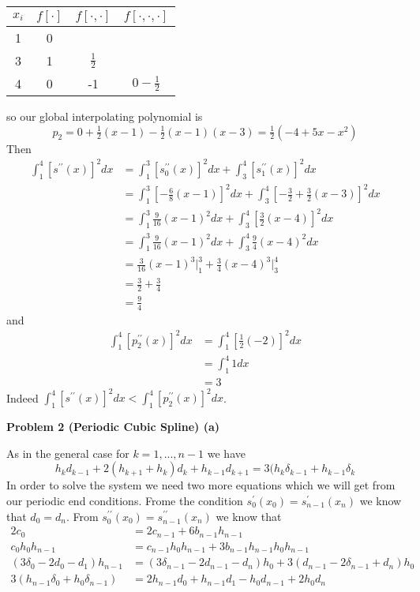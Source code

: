 \documentclass[12pt]{article}
\newcommand{\problem}[1]{\hspace{-4 ex} \large \textbf{Problem #1} }
\begin{document}
	\begin{center}
		\begin{tabular}{|c|c|c|c|}\hline
			$x_i$ & $f[\cdot]$ & $f[\cdot,\cdot]$ & $f[\cdot,\cdot,\cdot]$ \\ \hline
			1 & 0 & & \\ \hline
			3 & 1 & $\tfrac{1}{2}$ &\\ \hline
			4 & 0 & -1 & $0-\tfrac{1}{2}$ \\ \hline
		\end{tabular}
	\end{center}
	so our global interpolating polynomial is 
	$$
	p_2 = 0 + \tfrac{1}{2}(x-1) - \tfrac{1}{2}(x-1)(x-3) = \tfrac{1}{2}(-4+5x-x^2)
	$$
	Then
	\begin{align*}
		\int_1^4 [s^{\prime\prime}(x)]^2 dx & = \int_1^3 [s_0^{\prime\prime}(x)]^2 dx + \int_3^4 [s_1^{\prime\prime}(x)]^2 dx \\
		& = \int_1^3 [-\tfrac{6}{8}(x-1)]^2 dx + \int_3^4 [-\tfrac{3}{2} + \tfrac{3}{2}(x-3)]^2 dx \\
		& = \int_1^3 \tfrac{9}{16}(x-1)^2 dx + \int_3^4 [\tfrac{3}{2}(x-4)]^2 dx \\
		& = \int_1^3 \tfrac{9}{16}(x-1)^2 dx + \int_3^4 \tfrac{9}{4}(x-4)^2 dx \\
		& = \tfrac{3}{16}(x-1)^3 \Big\vert_1^3 + \tfrac{3}{4}(x-4)^3 \Big\vert_3^4 \\
		& = \tfrac{3}{2} + \tfrac{3}{4} \\
		& = \tfrac{9}{4}
	\end{align*}
	and 
	\begin{align*}
		\int_1^4 [p_2^{\prime\prime}(x)]^2 dx & = \int_1^4 [\tfrac{1}{2}(-2)]^2 dx \\
		& = \int_1^4 1 dx \\
		& = 3
	\end{align*}
	Indeed $\int_1^4 [s^{\prime\prime}(x)]^2 dx < \int_1^4 [p_2^{\prime\prime}(x)]^2 dx$.
	
\problem{2 (Periodic Cubic Spline) (a)}
	
	As in the general case for $k = 1, ..., n-1$ we have
	$$
	h_kd_{k-1} + 2(h_{k+1} + h_{k})d_k + h_{k-1}d_{k+1} = 3(h_k\delta_{k-1} + h_{k-1}\delta_{k}
	$$
	In order to solve the system we need two more equations which we will get from our periodic end conditions. Frome the condition $s_0^\prime(x_0) = s_{n-1}^\prime(x_n)$ we know that $d_0 = d_n$. From $s_0^{\prime\prime}(x_0) = s_{n-1}^{\prime\prime}(x_n)$ we know that
	\begin{align*}
		2c_0 & = 2c_{n-1} + 6b_{n-1}h_{n-1} \\
		c_0h_0h_{n-1} & = c_{n-1}h_0h_{n-1} + 3b_{n-1}h_{n-1}h_0h_{n-1} \\
		(3\delta_0 - 2d_0 - d_1)h_{n-1} & = (3\delta_{n-1} - 2d_{n-1} - d_n)h_{0} + 3(d_{n-1} -2\delta_{n-1} + d_n)h_{0} \\
		3(h_{n-1}\delta_0 + h_0\delta_{n-1}) & = 2h_{n-1} d_0 + h_{n-1}d_1 - h_0d_{n-1} + 2h_0d_n 
	\end{align*}
	

	
\end{document}
